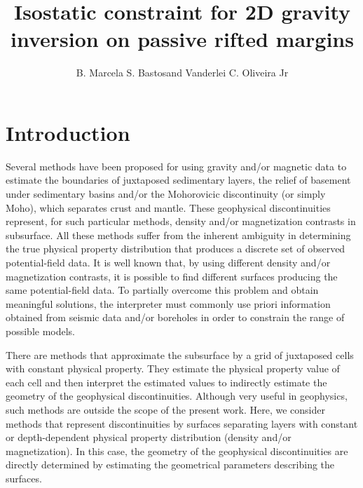 \documentclass[manuscript]{geophysics}
\begin{document}
\title{Isostatic constraint for 2D gravity inversion on passive rifted margins}

\renewcommand{\thefootnote}{\fnsymbol{footnote}} 


\address{
\footnotemark[1]Observat\'{o}rio Nacional, \\
Department of Geophysics, \\
Rio de Janeiro, Brazil}
\author{B. Marcela S. Bastos\footnotemark[1] and Vanderlei C. Oliveira Jr\footnotemark[1]}


\maketitle

\begin{abstract}

\lipsum[1]

\end{abstract}

\section{Introduction}

Several methods have been proposed for using gravity and/or magnetic data to estimate
the boundaries of juxtaposed sedimentary layers, the relief of basement under sedimentary 
basins and/or the Mohorovicic discontinuity (or simply Moho), which separates crust and 
mantle.
These geophysical discontinuities represent, for such particular methods, 
density and/or magnetization contrasts in subsurface.
All these methods suffer from the inherent ambiguity \citep{roy1962, skeels1962} in
determining the true physical property distribution that produces a discrete set of
observed potential-field data. 
It is well known that, by using different density and/or magnetization contrasts, 
it is possible to
find different surfaces producing the same potential-field data. 
To partially overcome this problem and obtain meaningful solutions, the interpreter
must commonly use priori information obtained from seismic data and/or boreholes in
order to constrain the range of possible models.

There are methods that approximate the subsurface by a grid of
juxtaposed cells with constant physical property. 
They estimate the physical property value of each cell and then 
interpret the estimated values to indirectly estimate the geometry of the 
geophysical discontinuities.
Although very useful in geophysics, such methods are
outside the scope of the present work.
Here, we consider methods that represent discontinuities by surfaces 
separating layers with constant or depth-dependent physical property distribution 
(density and/or magnetization).
In this case, the geometry of the geophysical discontinuities are directly determined
by estimating the geometrical parameters describing the surfaces.
\end{document}
